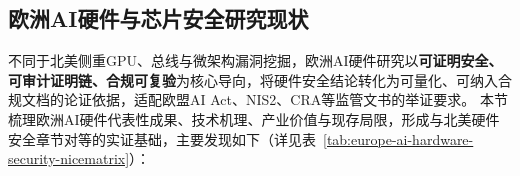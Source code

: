 



\subsection{欧洲AI硬件与芯片安全研究现状}
不同于北美侧重GPU、总线与微架构漏洞挖掘，欧洲AI硬件研究以\textbf{可证明安全、可审计证明链、合规可复验}为核心导向，将硬件安全结论转化为可量化、可纳入合规文档的论证依据，适配欧盟AI Act、NIS2、CRA等监管文书的举证要求。
%
本节梳理欧洲AI硬件代表性成果、技术机理、产业价值与现存局限，形成与北美硬件安全章节对等的实证基础，主要发现如下（详见表~\ref{tab:europe-ai-hardware-security-nicematrix}）：

